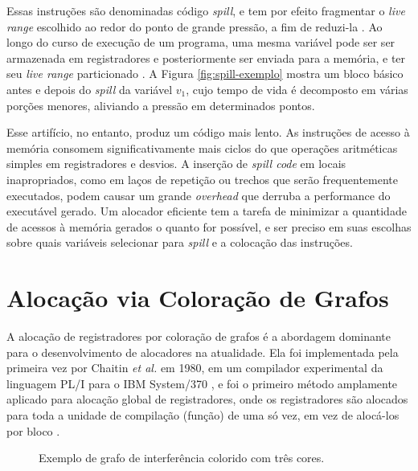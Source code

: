 \documentclass[
	12pt,				%
	openright,			%
	oneside,			%
	a4paper,			%
	tccpreliminar,			%
	]{ABNT-DC-UEL}
\begin{document}
Essas instruções são denominadas código \textit{spill}, e tem por efeito fragmentar o \textit{live range} escolhido ao redor do ponto de grande pressão, a fim de reduzi-la \cite{chaitin:81}. Ao longo do curso de execução de um programa, uma mesma variável pode ser ser armazenada em registradores e posteriormente ser enviada para a memória, e ter seu \textit{live range} particionado \cite{eisl:16}. A Figura \ref{fig:spill-exemplo} mostra um bloco básico antes e depois do \textit{spill} da variável $v_1$, cujo tempo de vida é decomposto em várias porções menores, aliviando a pressão em determinados pontos.

Esse artifício, no entanto, produz um código mais lento. As instruções de acesso à memória consomem significativamente mais ciclos do que operações aritméticas simples em registradores e desvios. A inserção de \textit{spill code} em locais inapropriados, como em laços de repetição ou trechos que serão frequentemente executados, podem causar um grande \textit{overhead} que derruba a performance do executável gerado. Um alocador eficiente tem a tarefa de minimizar a quantidade de acessos à memória gerados o quanto for possível, e ser preciso em suas escolhas sobre quais variáveis selecionar para \textit{spill} e a colocação das instruções.

\section{Alocação via Coloração de Grafos}

A alocação de registradores por coloração de grafos é a abordagem dominante para o desenvolvimento de alocadores na atualidade. Ela foi implementada pela primeira vez por Chaitin \textit{et al.} em 1980, em um compilador experimental da linguagem PL/I para o IBM System/370 \cite{chaitin:81}, e foi o primeiro método amplamente aplicado para alocação global de registradores, onde os registradores são alocados para toda a unidade de compilação (função) de uma só vez, em vez de alocá-los por bloco \cite{eisl:16}.

\begin{figure}[hbt]
    \centering
    
    \caption{Exemplo de grafo de interferência colorido com três cores.}
    \label{fig:grafo-petersen}
\end{figure}
\end{document}
